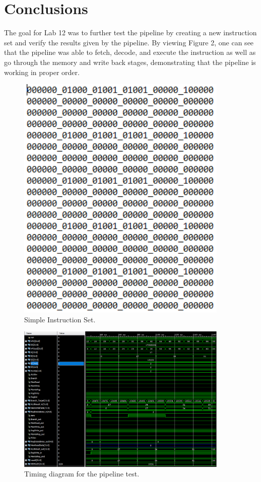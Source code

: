 \documentclass{article}
\begin{document}
\section{Conclusions}
The goal for Lab 12 was to further test the pipeline by creating a new instruction set and verify the results given by the pipeline. By viewing Figure 2, one can see that the pipeline was able to fetch, decode, and execute the instruction as well as go through the memory and write back stages, demonstrating that the pipeline is working in proper order.
\begin{figure}
	\begin{center}
		\caption{Simple Instruction Set.}\label{fig:one}
		\includegraphics[width=0.9\textwidth]{../images/instructions.png}
	\end{center}
\end{figure}
\begin{figure}
	\begin{center}
		\caption{Timing diagram for the pipeline test.}\label{fig:test}
		\includegraphics[width=0.9\textwidth]{../images/instructionstest.png}
	\end{center}
\end{figure}
\end{document}
